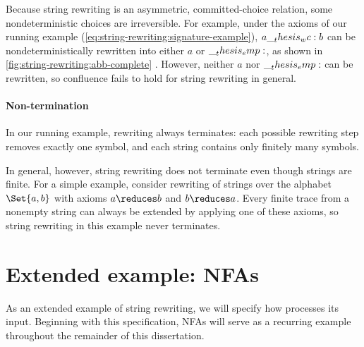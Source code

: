 Because string rewriting is an asymmetric, committed-choice relation, some nondeterministic choices are irreversible.
For example, under the axioms of our running example (\cref{eq:string-rewriting:signature-example}), $a \wc b$ can be nondeterministically rewritten into either $a$ or $\__thesis_emp:$, as shown in \cref{fig:string-rewriting:abb-complete}%
.
However, neither $a$ nor $\__thesis_emp:$ can be rewritten, so confluence fails to hold for string rewriting in general.

\paragraph*{Non-termination}
In our running example, rewriting always terminates: each possible rewriting step removes exactly one symbol, and each string contains only finitely many symbols.

In general, however, string rewriting does not terminate even though strings are finite.
For a simple example, consider rewriting of strings over the alphabet $\Set{a,b}$ with axioms
$a \reduces b$ and $b \reduces a$.
Every finite trace from a nonempty string can always be extended by applying one of these axioms, so string rewriting in this example never terminates.

\section{Extended example: \Aclp*{NFA}}\label{sec:string-rewriting:nfa}

As an extended example of string rewriting, we will specify how  processes its input.
Beginning with this specification, \acp{NFA} will serve as a recurring example throughout the remainder of this dissertation.
 
